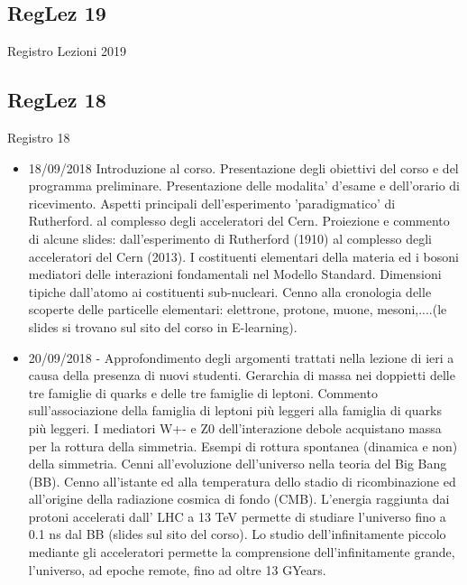 \subsection{RegLez 19}

\begin{wordonframe}{Registro Lezioni 2019}

\end{wordonframe}


\subsection{RegLez 18}

\begin{frame}{Registro 18}

\begin{itemize}
\item 18/09/2018 Introduzione al corso. Presentazione degli obiettivi del corso e del programma preliminare. Presentazione delle modalita' d'esame e dell'orario di ricevimento. Aspetti principali dell'esperimento 'paradigmatico' di Rutherford. al complesso degli acceleratori del Cern. Proiezione e commento di alcune slides: dall'esperimento di Rutherford (1910) al complesso degli acceleratori del Cern (2013). I costituenti elementari della materia ed i bosoni mediatori delle interazioni fondamentali nel Modello Standard. Dimensioni tipiche dall'atomo ai costituenti sub-nucleari. Cenno alla cronologia delle scoperte delle particelle elementari: elettrone, protone, muone, mesoni,....(le slides si trovano sul sito del corso in E-learning).
\item 20/09/2018 - Approfondimento degli argomenti trattati nella lezione di ieri a causa della presenza di nuovi studenti. Gerarchia di massa nei doppietti delle tre famiglie di quarks e delle tre famiglie di leptoni. Commento sull'associazione della famiglia di leptoni più leggeri alla famiglia di quarks più leggeri. I mediatori W+- e Z0 dell'interazione debole acquistano massa per la rottura della simmetria. Esempi di rottura spontanea (dinamica e non) della simmetria. Cenni all'evoluzione dell'universo nella teoria del Big Bang (BB). Cenno all'istante ed alla temperatura dello stadio di ricombinazione ed all'origine della radiazione cosmica di fondo (CMB). L'energia raggiunta dai protoni accelerati dall' LHC a 13 TeV permette di studiare l'universo fino a 0.1 ns dal BB (slides sul sito del corso). Lo studio dell'infinitamente piccolo mediante gli acceleratori permette la comprensione dell'infinitamente grande, l'universo, ad epoche remote, fino ad oltre 13 GYears.

\end{itemize}
\end{frame}
